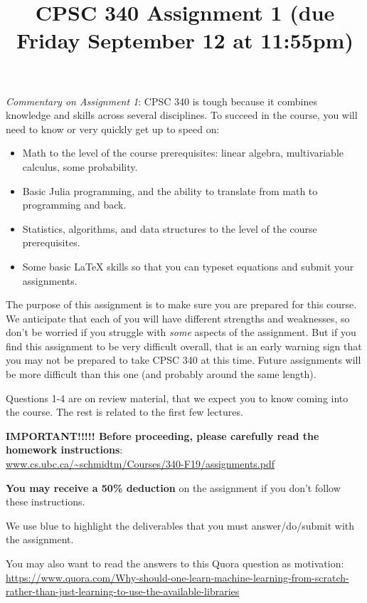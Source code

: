 \documentclass{article}
\def\blu#1{{\color{blu}#1}}
\begin{document}
\title{CPSC 340 Assignment 1 (due Friday September 12 at 11:55pm)}
\date{}
\maketitle
\vspace{-4em}

\emph{Commentary on Assignment 1}: CPSC 340 is tough because it combines knowledge and skills across several disciplines. To succeed
in the course, you will need to know or very quickly get up to speed on:
\begin{itemize}
\item Math to the level of the course prerequisites: linear algebra, multivariable calculus, some probability.
\item Basic Julia programming, and the ability to translate from math to programming and back.
\item Statistics, algorithms, and data structures to the level of the course prerequisites.
\item Some basic LaTeX skills so that you can typeset equations and submit your assignments.
\end{itemize}

The purpose of this assignment is to make sure you are prepared for this course. We anticipate that each
of you will have different strengths and weaknesses, so don't be worried if you struggle with \emph{some} aspects
of the assignment. But if you find this assignment
to be very difficult overall, that is an early warning sign that you may not be prepared to take CPSC 340
at this time. Future assignments will be more difficult than this one (and probably around the same length).

Questions 1-4 are on review material, that we expect you to know coming into the course. The rest is related to the first few lectures.

\textbf{IMPORTANT!!!!! Before proceeding, please carefully read the homework instructions}:\\ \url{www.cs.ubc.ca/~schmidtm/Courses/340-F19/assignments.pdf}

\textbf{You may receive a 50\% deduction} on the assignment if you don't follow these instructions.

We use \blu{blue} to highlight the deliverables that you must answer/do/submit with the assignment.

You may also want to read the answers to this Quora question as motivation:\\
{\scriptsize \url{https://www.quora.com/Why-should-one-learn-machine-learning-from-scratch-rather-than-just-learning-to-use-the-available-libraries}}
\end{document}
